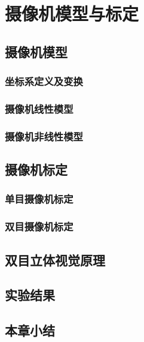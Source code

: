 
\chapter{摄像机模型与标定}

\section{摄像机模型}
\subsection{坐标系定义及变换}

\subsection{摄像机线性模型}

\subsection{摄像机非线性模型}

\section{摄像机标定}
\subsection{单目摄像机标定}
\subsection{双目摄像机标定}

\section{双目立体视觉原理}

\section{实验结果}

\section{本章小结}
